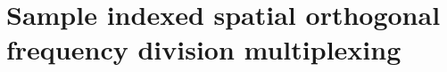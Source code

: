 \section{Sample indexed spatial orthogonal frequency division multiplexing}
\label{sec:sisofdm}

\graphicspath{{_MIMOSpace/figures_sisofdm/}}



